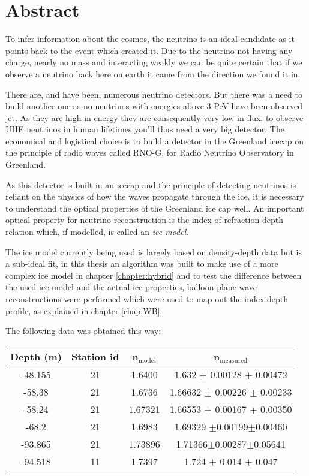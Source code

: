 \chapter*{Abstract}
To infer information about the cosmos, the neutrino is an ideal candidate as it
points back to the event which created it.  Due to the neutrino not having any charge,
nearly no mass and interacting weakly we can be quite certain that if we
observe a neutrino back here on earth it came from the direction we found it in.

There are, and have been, numerous neutrino detectors. But there was a need to
build another one as no neutrinos with energies above 3 PeV have been
observed jet. As they are high in energy they are consequently very low in flux, to
observe UHE neutrinos in human lifetimes you'll thus need a very big
detector.  The economical and logistical choice is to build a detector in the
Greenland icecap on the principle of radio waves called RNO-G, for
Radio Neutrino Observatory in Greenland.

As this detector is built in an icecap and the principle of detecting neutrinos is reliant
on the physics of how the waves propagate through the ice, it is necessary to understand 
the optical properties of the Greenland ice cap well. An important optical property
for neutrino reconstruction is the index of refraction-depth relation which, if modelled,
is called an \textit{ice model}.

The ice model currently being used is largely based on density-depth data but is 
a sub-ideal fit, in this thesis an algorithm was built to make use of a more complex
ice model in chapter \ref{chapter:hybrid} and to test the difference between the
used ice model and the actual ice properties, balloon plane wave reconstructions were
performed which were used to map out the index-depth profile, as explained in chapter \ref{chap:WB}.

The following data was obtained this way:
\begin{center}
\begin{tabular}{||c c c c||}
 \hline
 Depth (m) & Station id & n$_\text{model}$ & n$_\text{measured}$\\ [0.5ex]
 \hline\hline
 -48.155 & 21 & 1.6400 & 1.632 $\pm$ 0.00128 $\pm$ 0.00472\\
 -58.38 & 21 & 1.6736 & 1.66632 $\pm$ 0.00226 $\pm$ 0.00233 \\
 -58.24 & 21 & 1.67321 & 1.66553 $\pm$ 0.00167 $\pm$ 0.00350 \\
 -68.2 & 21 & 1.6983 & 1.69329 $\pm$0.00199$\pm$0.00460 \\
 -93.865 & 21 & 1.73896 & 1.71366$\pm$0.00287$\pm$0.05641\\
 -94.518 & 11 & 1.7397 & 1.724 $\pm$ 0.014 $\pm$ 0.047 \\
 \hline
\end{tabular}
\end{center}
\newpage
